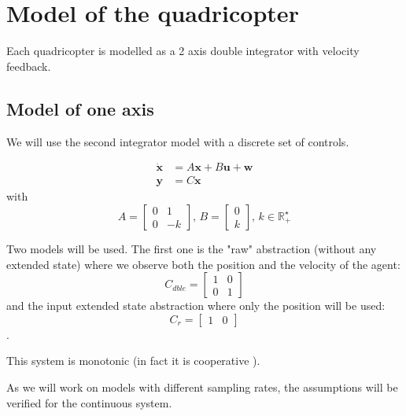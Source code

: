 \section{Model of the quadricopter}
Each quadricopter is modelled as a 2 axis double integrator with velocity feedback.

\subsection{Model of one axis}
We will use the second integrator model with a discrete set of controls.

\begin{equation}\label{eqn:lin_sys}
\begin{split}
\dot{\mathbf{x}} &= A \mathbf{x} + B \mathbf{u} + \mathbf{w}\\
\mathbf{y} &= C\mathbf{x}
\end{split}
\end{equation}
with
\begin{equation*} \label{eqn:sec_int}
A = \begin{bmatrix}
0 & 1\\ 
0 & -k
\end{bmatrix}
\textrm{, }
B = \begin{bmatrix}
0 \\ 
k 
\end{bmatrix}
\textrm{, }
k \in \mathbb{R}_+^\star
\end{equation*}

Two models will be used. The first one is the "raw" abstraction (without any extended state) where we observe both the position and the velocity of the agent:
\begin{equation}
C_{dble} = \begin{bmatrix}
1 & 0\\
0 & 1
\end{bmatrix}
\end{equation}
and the input extended state abstraction where only the position will be used:
\begin{equation}
 C_r = \begin{bmatrix}
 1 & 0
 \end{bmatrix}
\end{equation}.

This system is monotonic (in fact it is cooperative ).

As we will work on models with different sampling rates, the assumptions will be verified for the continuous system.

